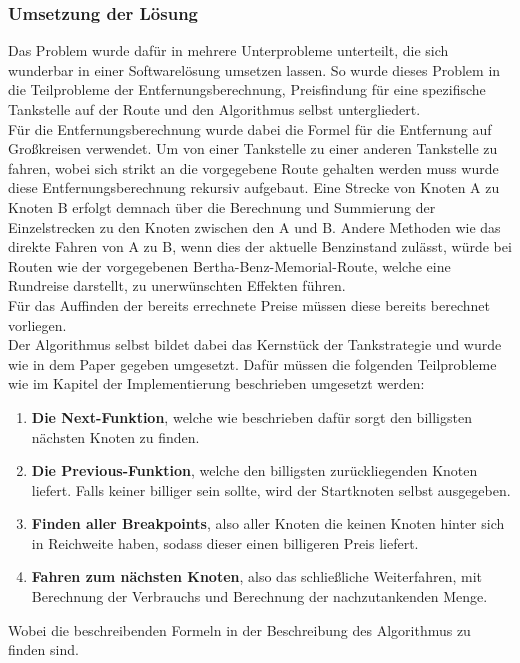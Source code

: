 \documentclass[11pt]{article}
\begin{document}
\subsubsection{Umsetzung der Lösung}
	Das Problem wurde dafür in mehrere Unterprobleme unterteilt, die sich wunderbar in einer Softwarelösung umsetzen lassen. So wurde dieses Problem in die Teilprobleme der Entfernungsberechnung, Preisfindung für eine spezifische Tankstelle auf der Route und den Algorithmus selbst untergliedert. \\
	Für die Entfernungsberechnung wurde dabei die Formel für die Entfernung auf Großkreisen verwendet. Um von einer Tankstelle zu einer anderen Tankstelle zu fahren, wobei sich strikt an die vorgegebene Route gehalten werden muss wurde diese Entfernungsberechnung rekursiv aufgebaut. Eine Strecke von Knoten A zu Knoten B erfolgt demnach über die Berechnung und Summierung der Einzelstrecken zu den Knoten zwischen den A und B. Andere Methoden wie das direkte Fahren von A zu B, wenn dies der aktuelle Benzinstand zulässt, würde bei Routen wie der vorgegebenen Bertha-Benz-Memorial-Route, welche eine Rundreise darstellt, zu unerwünschten Effekten führen. \\
	Für das Auffinden der bereits errechnete Preise müssen diese bereits berechnet vorliegen. \\
	Der Algorithmus selbst bildet dabei das Kernstück der Tankstrategie und wurde wie in dem Paper gegeben umgesetzt. Dafür müssen die folgenden Teilprobleme wie im Kapitel der Implementierung beschrieben umgesetzt werden:
	\begin{enumerate}
		\item \textbf{Die Next-Funktion}, welche wie beschrieben dafür sorgt den billigsten nächsten Knoten zu finden.
		\item \textbf{Die Previous-Funktion}, welche den billigsten zurückliegenden Knoten liefert. Falls keiner billiger sein sollte, wird der Startknoten selbst ausgegeben.
		\item \textbf{Finden aller Breakpoints}, also aller Knoten die keinen Knoten hinter sich in Reichweite haben, sodass dieser einen billigeren Preis liefert.
		\item \textbf{Fahren zum nächsten Knoten}, also das schließliche Weiterfahren, mit Berechnung der Verbrauchs und Berechnung der nachzutankenden Menge.
	\end{enumerate}
	Wobei die beschreibenden Formeln in der Beschreibung des Algorithmus zu finden sind.
	
\end{document}
